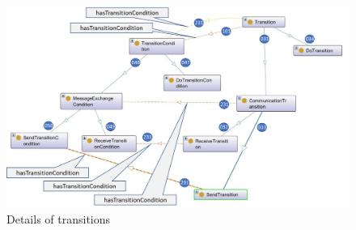 \begin{figure}[htbp]
	\centering
	\includegraphics[width=1.0\linewidth]{Figures/Ontology/SubjectExecution/20190105-Transitions}
	\caption[Details of transitions]{Details of transitions}
	\label{fig:20190105-transitions}
\end{figure}
